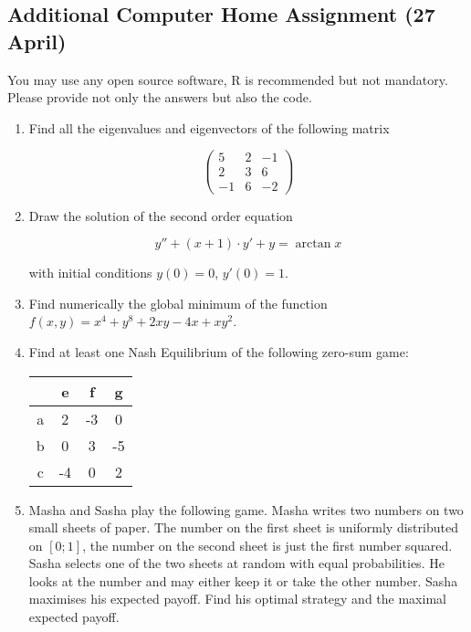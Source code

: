 \documentclass[a4paper]{article}
\begin{document}
\newpage
\subsection*{Additional Computer Home Assignment (27 April)}

You may use any open source software, R is recommended but not mandatory. Please provide not only the answers but also the code.  

\begin{enumerate}

\item Find all the eigenvalues and eigenvectors of the following matrix

\[
\begin{pmatrix}
5 & 2 & -1\\
2 & 3 & 6\\
-1 & 6 & -2
\end{pmatrix}
\]

\item Draw the solution of the second order equation

\[
y''+(x+1)\cdot y' + y=\arctan x
\]

with initial conditions $y(0)=0$, $y'(0)=1$.

\item Find numerically the global minimum of the function $f(x,y)=x^4+y^8+2xy-4x+xy^2$.

\item Find at least one Nash Equilibrium of the following zero-sum game:

\begin{tabular}{c|ccc}
 & e & f & g \\ 
\hline 
a & 2 & -3 & 0 \\ 
b & 0 & 3 & -5 \\ 
c & -4 & 0 & 2 \\ 
\end{tabular} 

\item Masha and Sasha play the following game. Masha writes two numbers on two small sheets of paper. The number on the first sheet is uniformly distributed on $[0;1]$, the number on the second sheet is just the first number squared. Sasha selects one of the two sheets at random with equal probabilities. He looks at the number and may either keep it or take the other number. Sasha maximises his expected payoff. Find his optimal strategy and the maximal expected payoff.

\end{enumerate}
\end{document}
